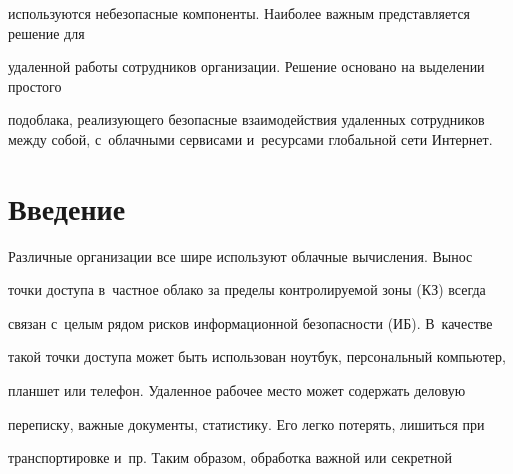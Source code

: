 {{используются небезопасные компоненты. Наиболее важным представляется решение для 


удаленной работы сотрудников организации. Решение основано на выделении простого 


подоблака, реализующего безопасные взаимодействия удаленных сотрудников между собой, с~облачными сервисами и~ресурсами глобальной сети Интернет.}


  

















 \thispagestyle{headings}


 


 \vspace*{-24pt}


  





  \section{Введение }


  


  Различные организации все шире используют облачные вычисления. Вынос 


точки доступа в~частное облако за пределы контролируемой зоны (КЗ) всегда 


связан с~целым рядом рисков информационной безопасности (ИБ). В~качестве 


такой точки доступа может быть использован ноутбук, персональный компьютер, 


планшет или телефон. Удаленное рабочее место может содержать деловую 


переписку, важные документы, статистику. Его легко потерять, лишиться при 


транспортировке и~пр. Таким образом, обработка важной или секретной 


}
